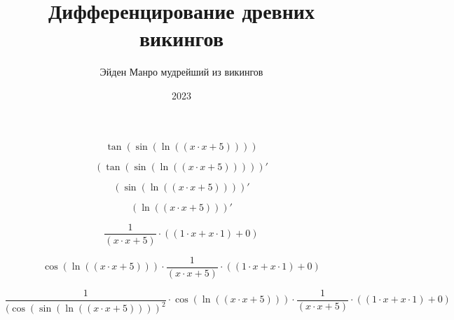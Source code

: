 \documentclass[a4paper,12pt]{article}
\title{\textbf{Дифференцирование древних викингов}}
\author{Эйден Манро мудрейший из викингов}
\date{2023}
\begin{document}
\maketitle


\begin{center}
\begin{equation}
\tan(\sin(\ln((x \cdot x + 5))))
\end{equation}
\end{center}



\begin{center}
\begin{equation}
(\tan(\sin(\ln((x \cdot x + 5)))))'
\end{equation}
\end{center}



\begin{center}
\begin{equation}
(\sin(\ln((x \cdot x + 5))))'
\end{equation}
\end{center}



\begin{center}
\begin{equation}
(\ln((x \cdot x + 5)))'
\end{equation}
\end{center}



\begin{center}
\begin{equation}
 \frac{1 }{ (x \cdot x + 5) }  \cdot ((1 \cdot x + x \cdot 1) + 0)
\end{equation}
\end{center}



\begin{center}
\begin{equation}
\cos(\ln((x \cdot x + 5))) \cdot  \frac{1 }{ (x \cdot x + 5) }  \cdot ((1 \cdot x + x \cdot 1) + 0)
\end{equation}
\end{center}



\begin{center}
\begin{equation}
 \frac{1 }{ (\cos(\sin(\ln((x \cdot x + 5))))^{2} }  \cdot \cos(\ln((x \cdot x + 5))) \cdot  \frac{1 }{ (x \cdot x + 5) }  \cdot ((1 \cdot x + x \cdot 1) + 0)
\end{equation}
\end{center}
\end{document}
